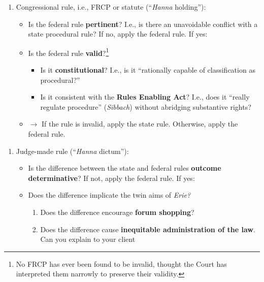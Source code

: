 \begin{enumerate}
\begin{enumerate}
        \begin{enumerate}
            \item Congressional rule, i.e., FRCP or statute (``\emph{Hanna} 
            holding''):
            \begin{itemize}
                \item Is the federal rule \textbf{pertinent}? I.e., is there 
                an unavoidable conflict with a state procedural rule? If no, 
                apply the federal rule. If yes:
                \item Is the federal rule \textbf{valid}?\footnote{No FRCP has 
                ever been found to be invalid, thought the Court has 
                interpreted them narrowly to preserve their validity.}
                \begin{itemize}
                    \item Is it \textbf{constitutional}? I.e., is it 
                    ``rationally capable of classification as procedural?''
                    \item Is it consistent with the \textbf{Rules Enabling 
                    Act}? I.e., does it ``really regulate procedure'' 
                    (\emph{Sibbach}) without abridging substantive rights?
                \end{itemize}
                \item $\rightarrow$ If the rule is invalid, apply the state 
                rule. Otherwise, apply the federal rule.
            \end{itemize}
        \end{enumerate}
        \begin{enumerate}
            \item Judge-made rule (``\emph{Hanna} dictum''):
            \begin{itemize}
                \item Is the difference between the state and federal rules \textbf{outcome determinative}? If not, apply the federal rule. If yes:
                \item Does the difference implicate the twin aims of 
                \emph{Erie?}
                \begin{enumerate}
                    \item Does the difference encourage \textbf{forum 
                    shopping}?
                    \item Does the difference cause \textbf{inequitable 
                    administration of the law}. Can you explain to your client 

\end{enumerate}
\end{itemize}
\end{enumerate}
\end{enumerate}
\end{enumerate}
